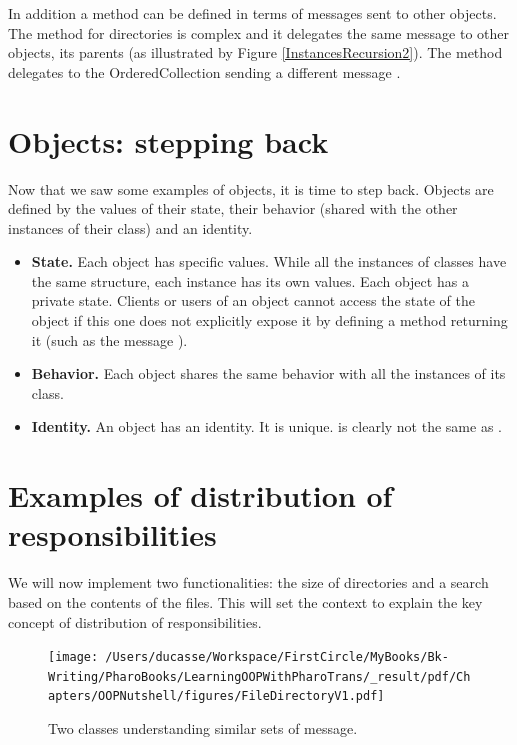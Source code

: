 \documentclass[10pt,twoside,english]{_support/latex/sbabook/sbabook}
\begin{document}
In addition a method can be defined in terms of messages sent to other objects. The method  for directories is complex and it delegates the same message to other objects, its parents (as illustrated by Figure \ref{InstancesRecursion2}). The method  delegates to the OrderedCollection sending a different message .
\section{Objects: stepping back}
Now that we saw some examples of objects, it is time to step back. Objects are defined by the values of their state, their behavior (shared with the other instances of their class) and an identity. 

\begin{itemize}
\item \textbf{State.} Each object has specific values. While all the instances of classes have the same structure, each instance has its own values. Each object has a private state. Clients or users of an object cannot access the state of the object if this one does not explicitly expose it by defining a method returning it (such as the message ).
\item \textbf{Behavior.} Each object shares the same behavior with all the instances of its class.
\item \textbf{Identity.} An object has an identity. It is unique.  is clearly not the same as .
\end{itemize}
\section{Examples of distribution of responsibilities }
We will now implement two functionalities: the size of directories and a search based on the contents of the files. This will set the context to explain the key concept of distribution of responsibilities.


\begin{figure}

\begin{center}
\texttt{[image: /Users/ducasse/Workspace/FirstCircle/MyBooks/Bk-Writing/PharoBooks/LearningOOPWithPharoTrans/\_result/pdf/Chapters/OOPNutshell/figures/FileDirectoryV1.pdf]}\caption{Two classes understanding similar sets of message.\label{NutFileDirectoryV1}}\end{center}
\end{figure}
\end{document}
